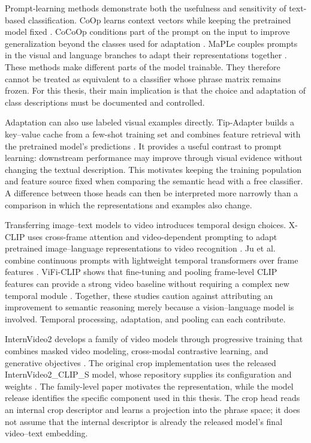 Prompt-learning methods demonstrate both the usefulness and sensitivity of text-based classification. CoOp learns context vectors while keeping the pretrained model fixed \cite{coop}. CoCoOp conditions part of the prompt on the input to improve generalization beyond the classes used for adaptation \cite{cocoop}. MaPLe couples prompts in the visual and language branches to adapt their representations together \cite{maple}. These methods make different parts of the model trainable. They therefore cannot be treated as equivalent to a classifier whose phrase matrix remains frozen. For this thesis, their main implication is that the choice and adaptation of class descriptions must be documented and controlled.

Adaptation can also use labeled visual examples directly. Tip-Adapter builds a key--value cache from a few-shot training set and combines feature retrieval with the pretrained model's predictions \cite{tip-adapter}. It provides a useful contrast to prompt learning: downstream performance may improve through visual evidence without changing the textual description. This motivates keeping the training population and feature source fixed when comparing the semantic head with a free classifier. A difference between those heads can then be interpreted more narrowly than a comparison in which the representations and examples also change.

Transferring image--text models to video introduces temporal design choices. X-CLIP uses cross-frame attention and video-dependent prompting to adapt pretrained image--language representations to video recognition \cite{xclip}. Ju et al. combine continuous prompts with lightweight temporal transformers over frame features \cite{efficient-prompt}. ViFi-CLIP shows that fine-tuning and pooling frame-level CLIP features can provide a strong video baseline without requiring a complex new temporal module \cite{vifi}. Together, these studies caution against attributing an improvement to semantic reasoning merely because a vision--language model is involved. Temporal processing, adaptation, and pooling can each contribute.

InternVideo2 develops a family of video models through progressive training that combines masked video modeling, cross-modal contrastive learning, and generative objectives \cite{internvideo2}. The original crop implementation uses the released InternVideo2\_CLIP\_S model, whose repository supplies its configuration and weights \cite{internvideo2-clip-s}. The family-level paper motivates the representation, while the model release identifies the specific component used in this thesis. The crop head reads an internal crop descriptor and learns a projection into the phrase space; it does not assume that the internal descriptor is already the released model's final video--text embedding.

